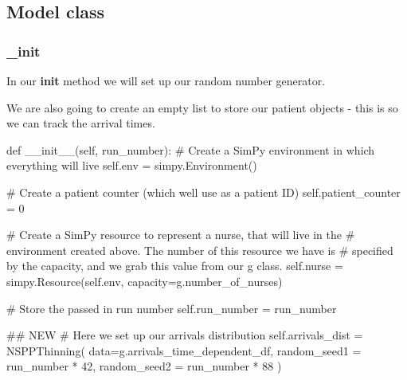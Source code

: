 \documentclass[
  letterpaper,
  DIV=11,
  numbers=noendperiod]{scrreprt}
\newenvironment{Shaded}{}{}
\newcommand{\CommentTok}[1]{\textcolor[rgb]{0.42,0.45,0.49}{#1}}
\newcommand{\DecValTok}[1]{\textcolor[rgb]{0.00,0.36,0.77}{#1}}
\newcommand{\FunctionTok}[1]{\textcolor[rgb]{0.44,0.26,0.76}{#1}}
\newcommand{\KeywordTok}[1]{\textcolor[rgb]{0.84,0.23,0.29}{#1}}
\newcommand{\NormalTok}[1]{\textcolor[rgb]{0.14,0.16,0.18}{#1}}
\newcommand{\OperatorTok}[1]{\textcolor[rgb]{0.14,0.16,0.18}{#1}}
\newcommand{\VariableTok}[1]{\textcolor[rgb]{0.89,0.38,0.04}{#1}}
\begin{document}
\subsection{Model class}\label{model-class-3}

\subsubsection{\_init}\label{init-1}

In our \textbf{init} method we will set up our random number generator.

We are also going to create an empty list to store our patient objects -
this is so we can track the arrival times.

\begin{Shaded}
\begin{Highlighting}[]
    \KeywordTok{def} \FunctionTok{\_\_init\_\_}\NormalTok{(}\VariableTok{self}\NormalTok{, run\_number):}
        \CommentTok{\# Create a SimPy environment in which everything will live}
        \VariableTok{self}\NormalTok{.env }\OperatorTok{=}\NormalTok{ simpy.Environment()}

        \CommentTok{\# Create a patient counter (which we\textquotesingle{}ll use as a patient ID)}
        \VariableTok{self}\NormalTok{.patient\_counter }\OperatorTok{=} \DecValTok{0}

        \CommentTok{\# Create a SimPy resource to represent a nurse, that will live in the}
        \CommentTok{\# environment created above.  The number of this resource we have is}
        \CommentTok{\# specified by the capacity, and we grab this value from our g class.}
        \VariableTok{self}\NormalTok{.nurse }\OperatorTok{=}\NormalTok{ simpy.Resource(}\VariableTok{self}\NormalTok{.env, capacity}\OperatorTok{=}\NormalTok{g.number\_of\_nurses)}

        \CommentTok{\# Store the passed in run number}
        \VariableTok{self}\NormalTok{.run\_number }\OperatorTok{=}\NormalTok{ run\_number}

        \CommentTok{\#\# NEW}
        \CommentTok{\# Here we set up our arrivals distribution}
        \VariableTok{self}\NormalTok{.arrivals\_dist }\OperatorTok{=}\NormalTok{ NSPPThinning(}
\NormalTok{          data}\OperatorTok{=}\NormalTok{g.arrivals\_time\_dependent\_df,}
\NormalTok{          random\_seed1 }\OperatorTok{=}\NormalTok{ run\_number }\OperatorTok{*} \DecValTok{42}\NormalTok{,}
\NormalTok{          random\_seed2 }\OperatorTok{=}\NormalTok{ run\_number }\OperatorTok{*} \DecValTok{88}
\NormalTok{        )}


\end{Highlighting}
\end{Shaded}
\end{document}
